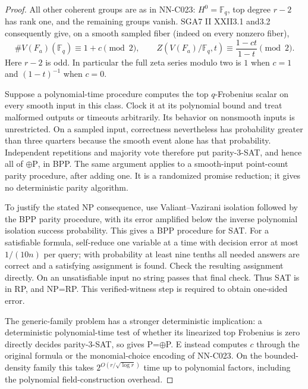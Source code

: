 \begin{proof}
All other coherent groups are as in NN-C023: $H^0=\mathbb F_q$, top degree $r-2$ has rank one, and the remaining groups vanish. SGA7 II XXII3.1 and3.2 consequently give, on a smooth sampled fiber (indeed on every nonzero fiber),
\[
 \#V(F_a)(\mathbb F_q)\equiv1+c\pmod2,
 \qquad
 Z(V(F_a)/\mathbb F_q,t)\equiv\frac{1-ct}{1-t}\pmod2.
\]
Here $r-2$ is odd. In particular the full zeta series modulo two is $1$ when $c=1$ and $(1-t)^{-1}$ when $c=0$.

Suppose a polynomial-time procedure computes the top $q$-Frobenius scalar on every smooth input in this class. Clock it at its polynomial bound and treat malformed outputs or timeouts arbitrarily. Its behavior on nonsmooth inputs is unrestricted. On a sampled input, correctness nevertheless has probability greater than three quarters because the smooth event alone has that probability. Independent repetitions and majority vote therefore put parity-3-SAT, and hence all of $\oplus\mathrm P$, in BPP. The same argument applies to a smooth-input point-count parity procedure, after adding one. It is a randomized promise reduction; it gives no deterministic parity algorithm.

To justify the stated NP consequence, use Valiant--Vazirani isolation followed by the BPP parity procedure, with its error amplified below the inverse polynomial isolation success probability. This gives a BPP procedure for SAT. For a satisfiable formula, self-reduce one variable at a time with decision error at most $1/(10n)$ per query; with probability at least nine tenths all needed answers are correct and a satisfying assignment is found. Check the resulting assignment directly. On an unsatisfiable input no string passes that final check. Thus SAT is in RP, and NP=RP. This verified-witness step is required to obtain one-sided error.

The generic-family problem has a stronger deterministic implication: a deterministic polynomial-time test of whether its linearized top Frobenius is zero directly decides parity-3-SAT, so gives P=$\oplus$P. E instead computes $c$ through the original formula or the monomial-choice encoding of NN-C023. On the bounded-density family this takes $2^{O(r/\sqrt{\log r})}$ time up to polynomial factors, including the polynomial field-construction overhead.
\end{proof}
